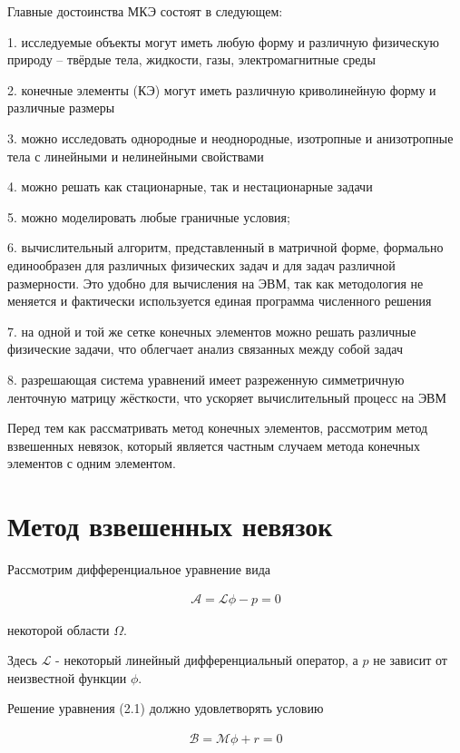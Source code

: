 \documentclass[14pt]{extreport}
\begin{document}
Главные достоинства МКЭ состоят в следующем:

1. исследуемые объекты могут иметь любую форму и различную физическую природу – твёрдые тела, жидкости, газы, электромагнитные среды

2. конечные элементы (КЭ) могут иметь различную криволинейную форму и различные размеры

3. можно исследовать однородные и неоднородные, изотропные и анизотропные тела с линейными и нелинейными свойствами

4. можно решать как стационарные, так и нестационарные задачи

5. можно моделировать любые граничные условия;

6. вычислительный алгоритм, представленный в матричной форме, формально единообразен для различных физических задач и для задач различной размерности. Это удобно для вычисления на ЭВМ, так как методология не меняется и фактически используется единая программа численного решения

7. на одной и той же сетке конечных элементов можно решать различные физические задачи, что облегчает анализ связанных между собой задач

8. разрешающая система уравнений имеет разреженную симметричную ленточную матрицу жёсткости, что ускоряет вычислительный процесс на ЭВМ

Перед тем как рассматривать метод конечных элементов, рассмотрим метод взвешенных невязок, который является частным случаем метода конечных элементов с одним элементом.

\section{Метод взвешенных невязок}

Рассмотрим дифференциальное уравнение вида

\begin{eqnarray}
 \mathcal A= \mathcal L\phi-p=0
\end{eqnarray}

 некоторой области $\Omega$.

Здесь $\mathcal L$ - некоторый линейный дифференциальный оператор, а $p$ не зависит от неизвестной функции $\phi$.

Решение уравнения (2.1) должно удовлетворять условию

\begin{eqnarray}
\mathcal B = \mathcal M \phi+r=0
\end{eqnarray}
\end{document}
